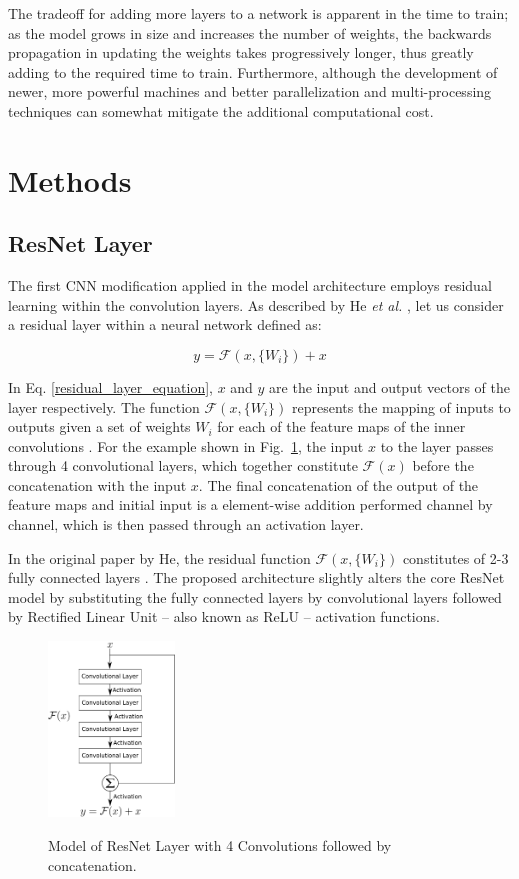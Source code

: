 \documentclass[conference]{IEEEtran}
\begin{document}
The tradeoff for adding more layers to a network is apparent in the time to train; as the model grows in size and increases the number of weights, the backwards propagation in updating the weights takes progressively longer, thus greatly adding to the required time to train. Furthermore, although the development of newer, more powerful machines and better parallelization and multi-processing techniques can somewhat mitigate the additional computational cost.
\section{Methods}
\subsection{ResNet Layer}
The first CNN modification applied in the model architecture employs residual learning within the convolution layers. As described by He \textit{et al.} \cite{He2016}, let us consider a residual layer within a neural network defined as:

\begin{equation}
y = \mathcal{F} \left(x,\{W_i\}\right) + x
\label{residual_layer_equation}
\end{equation}

In Eq. \ref{residual_layer_equation}, $x$ and $y$ are the input and output vectors of the layer respectively. The function $\mathcal{F} \left(x,\{W_i\}\right)$ represents the mapping of inputs to outputs given a set of weights $W_i$ for each of the feature maps of the inner convolutions \cite{He2016}. For the example shown in Fig.~\ref{ResNet_Layer_Model}, the input $x$ to the layer passes through 4 convolutional layers, which together constitute $\mathcal{F}(x)$ before the concatenation with the input $x$. The final concatenation of the output of the feature maps and initial input is a element-wise addition performed channel by channel, which is then passed through an activation layer. 

In the original paper by He, the residual function $\mathcal{F} \left(x,\{W_i\}\right)$ constitutes of 2-3 fully connected layers \cite{He2016}. The proposed architecture slightly alters the core ResNet model by substituting the fully connected layers by convolutional layers followed by Rectified Linear Unit -- also known as ReLU -- activation functions.

\begin{figure}
\centering
\includegraphics[width=0.3\textwidth]{figures/ResNet_Model.png}
\label{ResNet_Layer_Model}
\caption{Model of ResNet Layer with 4 Convolutions followed by concatenation.}
\end{figure}
\end{document}
